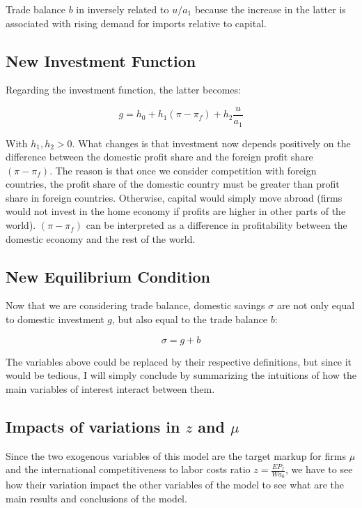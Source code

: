 \documentclass[
  letterpaper,
  DIV=11,
  numbers=noendperiod]{scrreprt}
\begin{document}
Trade balance \(b\) in inversely related to \(u/a_1\) because the
increase in the latter is associated with rising demand for imports
relative to capital.

\hypertarget{new-investment-function}{%
\subsection{New Investment Function}\label{new-investment-function}}

Regarding the investment function, the latter becomes:

\[g=h_0+h_1(\pi-\pi_f)+h_2\frac{u}{a_1}\]

With \(h_1,h_2>0\). What changes is that investment now depends
positively on the difference between the domestic profit share and the
foreign profit share \((\pi-\pi_f)\). The reason is that once we
consider competition with foreign countries, the profit share of the
domestic country must be greater than profit share in foreign countries.
Otherwise, capital would simply move abroad (firms would not invest in
the home economy if profits are higher in other parts of the world).
\((\pi-\pi_f)\) can be interpreted as a difference in profitability
between the domestic economy and the rest of the world.

\hypertarget{new-equilibrium-condition}{%
\subsection{New Equilibrium Condition}\label{new-equilibrium-condition}}

Now that we are considering trade balance, domestic savings \(\sigma\)
are not only equal to domestic investment \(g\), but also equal to the
trade balance \(b\):

\[\sigma=g+b\]

The variables above could be replaced by their respective definitions,
but since it would be tedious, I will simply conclude by summarizing the
intuitions of how the main variables of interest interact between them.

\hypertarget{impacts-of-variations-in-z-and-mu}{%
\subsection{\texorpdfstring{Impacts of variations in \(z\) and
\(\mu\)}{Impacts of variations in z and \textbackslash mu}}\label{impacts-of-variations-in-z-and-mu}}

Since the two exogenous variables of this model are the target markup
for firms \(\mu\) and the international competitiveness to labor costs
ratio \(z = \frac{EP_f}{Wa_0}\), we have to see how their variation
impact the other variables of the model to see what are the main results
and conclusions of the model.
\end{document}
